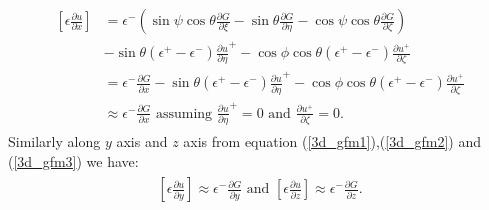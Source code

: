\begin{eqnarray}
\begin{aligned}   
		\left[\epsilon \frac{\partial u}{\partial x}\right]&= \epsilon^-\left( \sin \psi \cos \theta \frac{\partial G}{\partial \xi}-\sin \theta \frac{\partial G}{\partial \eta}-\cos \psi \cos \theta \frac{\partial G}{\partial \zeta}\right)\\
		 &-\sin\theta (\epsilon^+-\epsilon^-)\frac{\partial u}{\partial \eta}^+ -\cos{\phi} \cos \theta (\epsilon^+-\epsilon^-) \frac{\partial u^+}{\partial \zeta }\\
		 &=\epsilon^- \frac{\partial G}{\partial x}-\sin\theta (\epsilon^+-\epsilon^-)\frac{\partial u}{\partial \eta}^+ -\cos{\phi} \cos \theta (\epsilon^+-\epsilon^-) \frac{\partial u^+}{\partial \zeta }\\
		 &\approx \epsilon^- \frac{\partial G}{\partial x}\text{     assuming } \frac{\partial u}{\partial \eta}^+ =0 \text{ and } \frac{\partial u^+}{\partial \zeta }=0.  
\end{aligned}\label{eq:m-gfm1}		  	
\end{eqnarray}
Similarly along $y$ axis and $z$ axis from equation (\ref{3d_gfm1}),(\ref{3d_gfm2}) and (\ref{3d_gfm3}) we have:
\begin{eqnarray}
\begin{aligned}  
\left[\epsilon \frac{\partial u}{\partial y}\right]\approx\epsilon^- \frac{\partial G}{\partial y}\text{ and } \left[\epsilon \frac{\partial u}{\partial z}\right]\approx\epsilon^- \frac{\partial G}{\partial z}.\label{eq:m-gfm2}
\end{aligned}		  	
\end{eqnarray}

